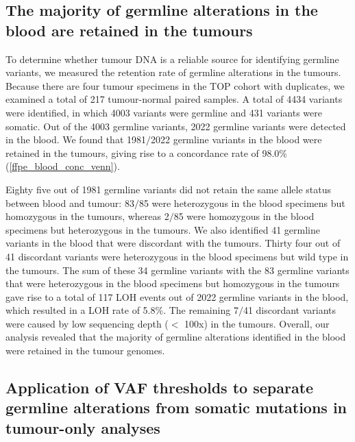 \documentclass{bmcart}
\begin{document}
\subsection*{The majority of germline alterations in the blood are retained in the tumours}

To determine whether tumour DNA is a reliable source for identifying germline variants, we measured the retention rate of germline alterations in the tumours. Because there are four tumour specimens in the TOP cohort with duplicates, we examined a total of 217 tumour-normal paired samples. A total of 4434 variants were identified, in which 4003 variants were germline and 431 variants were somatic. Out of the 4003 germline variants, 2022 germline variants were detected in the blood. We found that 1981$/$2022 germline variants in the blood were retained in the tumours, giving rise to a concordance rate of 98.0\% (\autoref{ffpe_blood_conc_venn}).

Eighty five out of 1981 germline variants did not retain the same allele status between blood and tumour: 83$/$85 were heterozygous in the blood specimens but homozygous in the tumours, whereas 2$/$85 were homozygous in the blood specimens but heterozygous in the tumours. We also identified 41 germline variants in the blood that were discordant with the tumours. Thirty four out of 41 discordant variants were heterozygous in the blood specimens but wild type in the tumours. The sum of these 34 germline variants with the 83 germline variants that were heterozygous in the blood specimens but homozygous in the tumours gave rise to a total of 117 LOH events out of 2022 germline variants in the blood, which resulted in a LOH rate of 5.8\%. The remaining 7$/$41 discordant variants were caused by low sequencing depth ($<$ 100x) in the tumours. Overall, our analysis revealed that the majority of germline alterations identified in the blood were retained in the tumour genomes.

\subsection*{Application of VAF thresholds to separate germline alterations from somatic mutations in tumour-only analyses}
\end{document}
